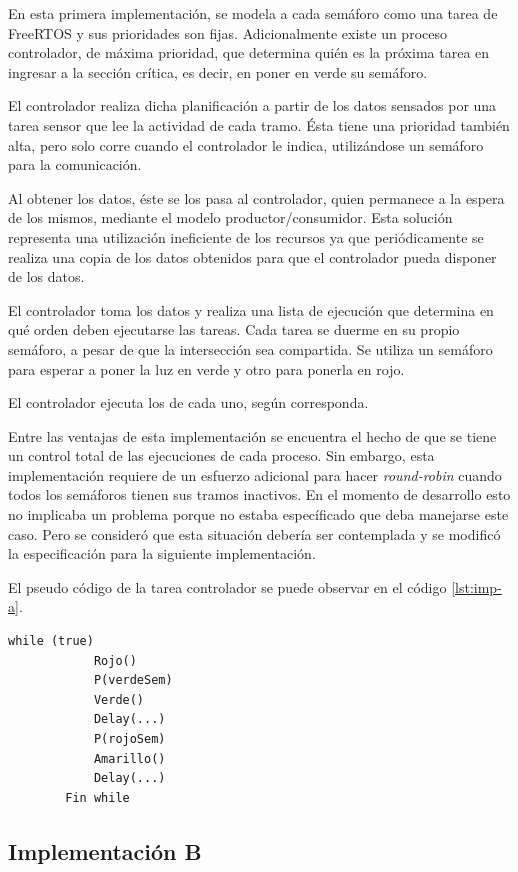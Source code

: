 	En esta primera implementación, se modela a cada semáforo como una tarea de FreeRTOS y sus prioridades son fijas.
	Adicionalmente existe un proceso controlador, de máxima prioridad, que determina quién es la próxima tarea en ingresar a la sección crítica, es decir, en poner en verde su semáforo.

	El controlador realiza dicha planificación a partir de los datos sensados por una tarea sensor que lee la actividad de cada tramo.
	Ésta tiene una prioridad también alta, pero solo corre cuando el controlador le indica, utilizándose un semáforo para la comunicación.

	Al obtener los datos, éste se los pasa al controlador, quien permanece a la espera de los mismos, mediante el modelo productor/consumidor.
	Esta solución representa una utilización ineficiente de los recursos ya que periódicamente se realiza una copia de los datos obtenidos para que el controlador pueda disponer de los datos.

	El controlador toma los datos y realiza una lista de ejecución que determina en qué orden deben ejecutarse las tareas.
	Cada tarea se duerme en su propio semáforo, a pesar de que la intersección sea compartida.
	Se utiliza un semáforo para esperar a poner la luz en verde y otro para ponerla en rojo.

	El controlador ejecuta los  de cada uno, según corresponda.

	Entre las ventajas de esta implementación se encuentra el hecho de que se tiene un control total de las ejecuciones de cada proceso.
	Sin embargo, esta implementación requiere de un esfuerzo adicional para hacer \emph{round-robin} cuando todos los semáforos tienen sus tramos inactivos. En el momento de desarrollo esto no implicaba un problema porque no estaba específicado que deba manejarse este caso. Pero se consideró que esta situación debería ser contemplada y se modificó la especificación para la siguiente implementación.

	El pseudo código de la tarea controlador se puede observar en el código \ref{lst:imp-a}.

	\begin{lstlisting}[float, label=lst:imp-a, caption=Pseudocódigo de la tarea controlador.]
		while (true)
			Rojo()
			P(verdeSem)
			Verde()
			Delay(...)
			P(rojoSem)
			Amarillo()
			Delay(...)
		Fin while
	\end{lstlisting}



	\subsection{Implementación B}

